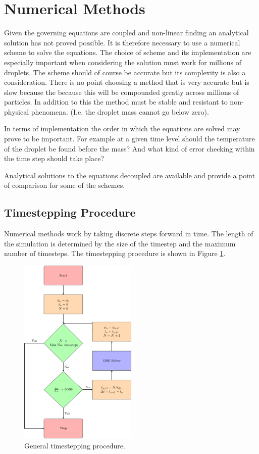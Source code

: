 \documentclass[../Interim_Report_Master]{subfiles}
\begin{document}
\hypertarget{num_meth}{\section{Numerical Methods}\label{num_meth}}
Given the governing equations are coupled and non-linear finding an analytical solution has not proved possible. It is therefore necessary to use a numerical scheme to solve the equations. The choice of scheme and its implementation are especially important when considering the solution must work for millions of droplets. The scheme should of course be accurate but its complexity is also a consideration. There is no point choosing a method that is very accurate but is slow because the because this will be compounded greatly across millions of particles. In addition to this the method must be stable and resistant to non-physical phenomena. (I.e. the droplet mass cannot go below zero).

In terms of implementation the order in which the equations are solved may prove to be important. For example at a given time level should the temperature of the droplet be found before the mass? And what kind of error checking within the time step should take place?

Analytical solutions to the equations decoupled are available and provide a point of comparison for some of the schemes.

\subsection{Timestepping Procedure}
Numerical methods work by taking discrete steps forward in time. The length of the simulation is determined by the size of the timestep and the maximum number of timesteps. The timestepping procedure is shown in Figure \ref{timestep_proc}.

\begin{figure}
	\centering
	\includegraphics[width=0.5\textwidth]{./Diagrams/Timestepping_Procedure/Timestepping_Procedure.pdf}
	\caption{General timestepping procedure.}
	\label{timestep_proc}
\end{figure}
\end{document}
